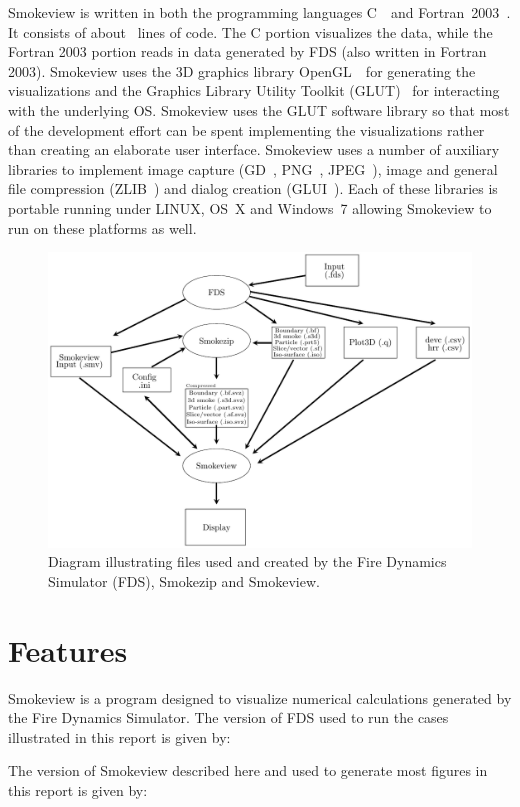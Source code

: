 \documentclass[11pt,twoside]{book}
\begin{document}
Smokeview is written in both the programming languages
C~\cite{C:book}\ and Fortran~2003~\cite{Fortran:book}.  It consists
of about \smvlines\ lines of code. The C portion visualizes the
data, while the Fortran 2003 portion reads in data generated by
FDS (also written in Fortran 2003). Smokeview uses the 3D graphics
library OpenGL~\cite{OpenGLRed}\ for generating the visualizations
and the Graphics Library Utility Toolkit (GLUT)~\cite{OpenGLGlut}
for interacting with the underlying OS. Smokeview uses the GLUT
software library so that most of the development effort can be
spent implementing the visualizations rather than creating an
elaborate user interface. Smokeview uses a number of auxiliary
libraries to implement image capture (GD~\cite{BOUTELL,GDLIB},
PNG~\cite{PNGLIB}, JPEG~\cite{JPEGLIB}), image and general file
compression (ZLIB~\cite{ZLIB}) and dialog creation
(GLUI~\cite{GLUILIB}). Each of these libraries is portable running
under LINUX, OS~X and Windows~7 allowing
Smokeview to run on these platforms as well.
\begin{figure}[bph]
\centerline{
\includegraphics[width=6.5in]{FIGURES/SMV_Overview_Diagram}}
 \caption[FDS file overview]{Diagram illustrating files used and created by the Fire Dynamics
 Simulator (FDS), Smokezip and Smokeview.}
\label{figfdsoverview}%
\end{figure}

\section{Features}

Smokeview is a program designed to visualize numerical
calculations generated by the Fire Dynamics Simulator.
The version of FDS used to run the cases illustrated  in this report
is given by:

The version of Smokeview described here and used
to generate most figures in this report is given by:

\end{document}
